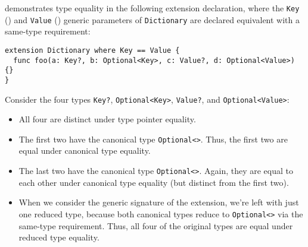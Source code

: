 \documentclass[../generics]{subfiles}
\begin{document}
\begin{figure}\label{type equality fig}
\end{figure}

 demonstrates type equality in the following extension declaration, where the \texttt{Key} () and \texttt{Value} () generic parameters of \texttt{Dictionary} are declared equivalent with a same-type requirement:
\begin{Verbatim}
extension Dictionary where Key == Value {
  func foo(a: Key?, b: Optional<Key>, c: Value?, d: Optional<Value>) {}
}
\end{Verbatim}
Consider the four types \texttt{Key?}, \texttt{Optional<Key>}, \texttt{Value?}, and \texttt{Optional<Value>}:
\begin{itemize}
\item All four are distinct under type pointer equality.
\item The first two have the canonical type \texttt{Optional<>}. Thus, the first two are equal under canonical type equality.
\item The last two have the canonical type \texttt{Optional<>}. Again, they are equal to each other under canonical type equality (but distinct from the first two).
\item When we consider the generic signature of the extension, we're left with just one reduced type, because both canonical types reduce to \texttt{Optional<>} via the same-type requirement. Thus, all four of the original types are equal under reduced type equality.
\end{itemize}
\end{document}
